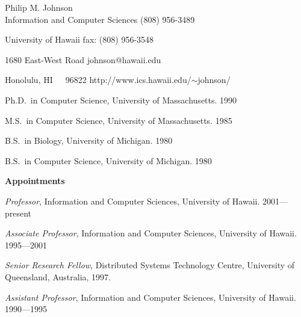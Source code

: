 \documentclass[11pt]{article}
\begin{document}

\newcommand{\newcategory}[1]{\newenvironment{#1}
 {\sectionheading{#1}\begin{list}{}{\setlength{\labelwidth}{0cm} \setlength{\labelsep}{0cm} \setlength{\itemsep}{0ex plus0.2ex} \setlength{\itemindent}{-1cm} \setlength{\leftmargin}{1cm} \setlength{\parsep}{0ex plus0.2ex}}}{\end{list}\par}}
\newcommand{\sectionheading}[1]{\medskip\pagebreak[2]\par\noindent
 {\small\bf #1}\nopagebreak}

\begin{center}
Philip M. Johnson\\
Information and Computer Sciences \hfill (808) 956-3489

University of Hawaii              \hfill fax: (808) 956-3548

1680 East-West Road               \hfill johnson@hawaii.edu

Honolulu, HI~~~96822              \hfill http://www.ics.hawaii.edu/$\sim$johnson/

\end{center}

\newcategory{Professional Preparation}
\begin{Professional Preparation}
\item Ph.D.~in Computer Science, University of Massachusetts. 1990 
\item M.S.~in Computer Science, University of Massachusetts.  1985
\item B.S.~in Biology, University of Michigan. 1980
\item B.S.~in Computer Science, University of Michigan. 1980
\end{Professional Preparation}

\newcategory{Appointments}
\begin{Appointments}
\item {\em Professor},  Information and Computer
  Sciences, University of Hawaii.  2001---present

\item {\em Associate Professor},  Information and Computer
  Sciences, University of Hawaii.  1995---2001

\item {\em Senior Research Fellow},  Distributed Systems Technology Centre,
University of Queensland, Australia, 1997.

\item {\em Assistant Professor},   Information and Computer
  Sciences, University of Hawaii.  1990---1995

\end{Appointments}
\end{document}
